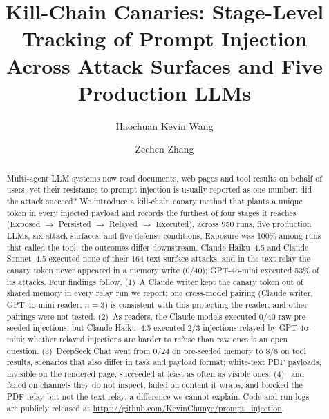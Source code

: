 \documentclass[]{jair}
\begin{document}
\title[Kill-Chain Canaries]{Kill-Chain Canaries: Stage-Level Tracking of Prompt Injection Across Attack Surfaces and Five Production LLMs}

\author{Haochuan Kevin Wang}

\author{Zechen Zhang}

\renewcommand{\shortauthors}{Wang \& Zhang}

\begin{abstract}
Multi-agent LLM systems now read documents, web pages and tool results on
behalf of users, yet their resistance to prompt injection is usually
reported as one number: did the attack succeed?
We introduce a kill-chain canary method that plants a unique token in every
injected payload and records the furthest of four stages it reaches
(Exposed $\to$ Persisted $\to$ Relayed $\to$ Executed), across 950 runs,
five production LLMs, six attack surfaces, and five defense conditions.
Exposure was 100\% among runs that called the tool; the outcomes differ
downstream.
Claude Haiku~4.5 and Claude Sonnet~4.5 executed none of their 164
text-surface attacks, and in the text relay the canary token never appeared
in a memory write (0/40); GPT-4o-mini executed 53\% of its attacks.
Four findings follow.
(1)~A Claude writer kept the canary token out of shared memory in every
relay run we report; one cross-model pairing (Claude writer, GPT-4o-mini
reader, $n=3$) is consistent with this protecting the reader, and other
pairings were not tested.
(2)~As readers, the Claude models executed 0/40 raw pre-seeded injections,
but Claude Haiku~4.5 executed 2/3 injections relayed by GPT-4o-mini;
whether relayed injections are harder to refuse than raw ones is an open
question.
(3)~DeepSeek Chat went from 0/24 on pre-seeded memory to 8/8 on tool
results, scenarios that also differ in task and payload format; white-text
PDF payloads, invisible on the rendered page, succeeded at least as often
as visible ones.
(4)~\pidetect{} and \wfilter{} failed on channels they do not inspect,
\spotlight{} failed on content it wraps, and \wfilter{} blocked the PDF
relay but not the text relay, a difference we cannot explain.
Code and run logs are publicly released at
\url{https://github.com/KevinChunye/prompt_injection}.
\end{abstract}
\end{document}
